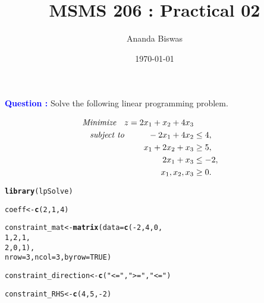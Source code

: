 \documentclass[11pt, a4paper]{article}\usepackage[]{graphicx}\usepackage[]{xcolor}
\title{MSMS 206 : Practical 02}
\author{Ananda Biswas}
\date{\today}
\makeatletter
\newcommand{\hlnum}[1]{\textcolor[rgb]{0.686,0.059,0.569}{#1}}%
\newcommand{\hlsng}[1]{\textcolor[rgb]{0.192,0.494,0.8}{#1}}%
\newcommand{\hlopt}[1]{\textcolor[rgb]{0,0,0}{#1}}%
\newcommand{\hldef}[1]{\textcolor[rgb]{0.345,0.345,0.345}{#1}}%
\newcommand{\hlkwb}[1]{\textcolor[rgb]{0.69,0.353,0.396}{#1}}%
\newcommand{\hlkwc}[1]{\textcolor[rgb]{0.333,0.667,0.333}{#1}}%
\newcommand{\hlkwd}[1]{\textcolor[rgb]{0.737,0.353,0.396}{\textbf{#1}}}%
\newenvironment{kframe}{%
 \def\at@end@of@kframe{}%
 \ifinner\ifhmode%
  \def\at@end@of@kframe{\end{minipage}}%
  \begin{minipage}{\columnwidth}%
 \fi\fi%
 \def\FrameCommand##1{\hskip\@totalleftmargin \hskip-\fboxsep
 \colorbox{shadecolor}{##1}\hskip-\fboxsep
     \hskip-\linewidth \hskip-\@totalleftmargin \hskip\columnwidth}%
 \MakeFramed {\advance\hsize-\width
   \@totalleftmargin\z@ \linewidth\hsize
   \@setminipage}}%
 {\par\unskip\endMakeFramed%
 \at@end@of@kframe}
\newenvironment{knitrout}{}{} %
\makeatother
\begin{document}
\maketitle


 \hspace{0.2cm} \textcolor{blue}{\textbf{Question :}} Solve the following linear programming problem.

\begin{align*}
\textit{Minimize \hspace{6pt}} z = 2x_1 + x_2 + 4x_3 \\
\textit{subject to \hspace{25pt}} -2x_1 + 4x_2 &\leq 4, \\
x_1 + 2x_2 + x_3 &\geq 5, \\
2x_1 + x_3 &\leq -2, \\
x_1, x_2, x_3 &\geq 0.
\end{align*}




\begin{knitrout}
\color{fgcolor}\begin{kframe}
\begin{alltt}
\hlkwd{library}\hldef{(lpSolve)}
\end{alltt}
\end{kframe}
\end{knitrout}

\begin{knitrout}
\color{fgcolor}\begin{kframe}
\begin{alltt}
\hldef{coeff} \hlkwb{<-} \hlkwd{c}\hldef{(}\hlnum{2}\hldef{,} \hlnum{1}\hldef{,} \hlnum{4}\hldef{)}

\hldef{constraint_mat} \hlkwb{<-} \hlkwd{matrix}\hldef{(}\hlkwc{data} \hldef{=} \hlkwd{c}\hldef{(}\hlopt{-}\hlnum{2}\hldef{,} \hlnum{4}\hldef{,} \hlnum{0}\hldef{,}
                                  \hlnum{1}\hldef{,} \hlnum{2}\hldef{,} \hlnum{1}\hldef{,}
                                  \hlnum{2}\hldef{,} \hlnum{0}\hldef{,} \hlnum{1}\hldef{),}
                         \hlkwc{nrow} \hldef{=} \hlnum{3}\hldef{,} \hlkwc{ncol} \hldef{=} \hlnum{3}\hldef{,} \hlkwc{byrow} \hldef{=} \hlnum{TRUE}\hldef{)}

\hldef{constraint_direction} \hlkwb{<-} \hlkwd{c}\hldef{(}\hlsng{"<="}\hldef{,} \hlsng{">="}\hldef{,} \hlsng{"<="}\hldef{)}

\hldef{constraint_RHS} \hlkwb{<-} \hlkwd{c}\hldef{(}\hlnum{4}\hldef{,} \hlnum{5}\hldef{,} \hlopt{-}\hlnum{2}\hldef{)}
\end{alltt}
\end{kframe}
\end{knitrout}
\end{document}
